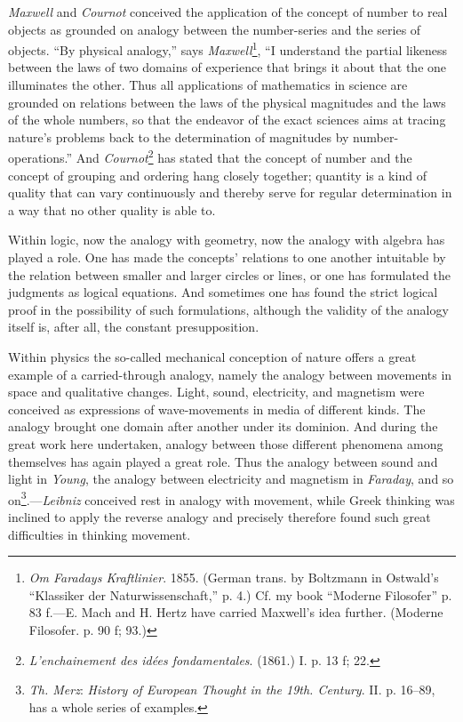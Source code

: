 \documentclass[12pt,a4paper]{book}
\newcommand{\opage}[1]{\marginnote{\footnotesize\textit{[#1]}}}
\begin{document}
\emph{Maxwell} and \emph{Cournot} conceived the application of the concept of
number to real objects as grounded on analogy between the number-series and
the series of objects. ``By physical analogy,'' says \emph{Maxwell}\footnote{\emph{Om
Faradays Kraftlinier}. 1855. (German trans. by Boltzmann in Ostwald's
``Klassiker der Naturwissenschaft,'' p. 4.) Cf. my book ``Moderne Filosofer''
p. 83 f.---E. Mach and H. Hertz have carried Maxwell's idea further. (Moderne
Filosofer. p. 90 f; 93.)}, ``I understand the partial likeness between the
laws of two domains of experience that brings it about that the one
illuminates the other. Thus all applications of mathematics in science are
grounded on relations between the laws of the physical magnitudes and the
laws of the whole numbers, so that the endeavor of the exact sciences aims at
tracing nature's problems back to the determination of magnitudes by
number-operations.'' \opage{184}And \emph{Cournot}\footnote{\emph{L'enchainement des
idées fondamentales}. (1861.) I. p. 13 f; 22.} has stated that the concept of
number and the concept of grouping and ordering hang closely together;
quantity is a kind of quality that can vary continuously and thereby serve
for regular determination in a way that no other quality is able to.

Within logic, now the analogy with geometry, now the analogy with algebra has
played a role. One has made the concepts' relations to one another intuitable
by the relation between smaller and larger circles or lines, or one has
formulated the judgments as logical equations. And sometimes one has found
the strict logical proof in the possibility of such formulations, although
the validity of the analogy itself is, after all, the constant presupposition.

Within physics the so-called mechanical conception of nature offers a great
example of a carried-through analogy, namely the analogy between movements in
space and qualitative changes. Light, sound, electricity, and magnetism were
conceived as expressions of wave-movements in media of different kinds. The
analogy brought one domain after another under its dominion. And during the
great work here undertaken, analogy between those different phenomena among
themselves has again played a great role. Thus the analogy between sound and
light in \emph{Young}, the analogy between electricity and magnetism in
\emph{Faraday}, and so on\footnote{\emph{Th. Merz}: \emph{History of European
Thought in the 19th. Century}. II. p. 16--89, has a whole series of
examples.}.---\emph{Leibniz} conceived rest in analogy with movement, while
Greek thinking was inclined to apply the reverse analogy and precisely
therefore found such great difficulties in thinking movement.
\end{document}
